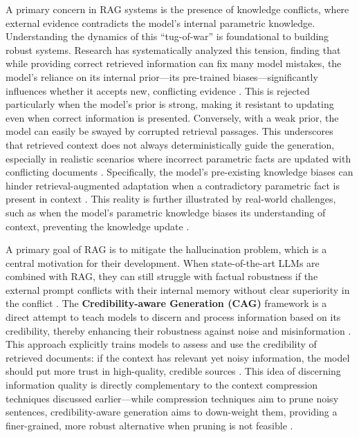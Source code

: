 \documentclass[11pt]{article}
\begin{document}
A primary concern in RAG systems is the presence of knowledge conflicts, where external evidence contradicts the model's internal parametric knowledge. Understanding the dynamics of this ``tug-of-war'' is foundational to building robust systems. Research has systematically analyzed this tension, finding that while providing correct retrieved information can fix many model mistakes, the model's reliance on its internal prior---its pre-trained biases---significantly influences whether it accepts new, conflicting evidence \cite{ref37}. This is rejected particularly when the model's prior is strong, making it resistant to updating even when correct information is presented. Conversely, with a weak prior, the model can easily be swayed by corrupted retrieval passages. This underscores that retrieved context does not always deterministically guide the generation, especially in realistic scenarios where incorrect parametric facts are updated with conflicting documents \cite{ref28}. Specifically, the model's pre-existing knowledge biases can hinder retrieval-augmented adaptation when a contradictory parametric fact is present in context \cite{ref28}. This reality is further illustrated by real-world challenges, such as when the model's parametric knowledge biases its understanding of context, preventing the knowledge update \cite{ref28}.

A primary goal of RAG is to mitigate the hallucination problem, which is a central motivation for their development. When state-of-the-art LLMs are combined with RAG, they can still struggle with factual robustness if the external prompt conflicts with their internal memory without clear superiority in the conflict \cite{ref180}. The \textbf{Credibility-aware Generation (CAG)} framework is a direct attempt to teach models to discern and process information based on its credibility, thereby enhancing their robustness against noise and misinformation \cite{ref35}. This approach explicitly trains models to assess and use the credibility of retrieved documents: if the context has relevant yet noisy information, the model should put more trust in high-quality, credible sources \cite{ref35}. This idea of discerning information quality is directly complementary to the context compression techniques discussed earlier---while compression techniques aim to prune noisy sentences, credibility-aware generation aims to down-weight them, providing a finer-grained, more robust alternative when pruning is not feasible \cite{ref35}.
\end{document}
